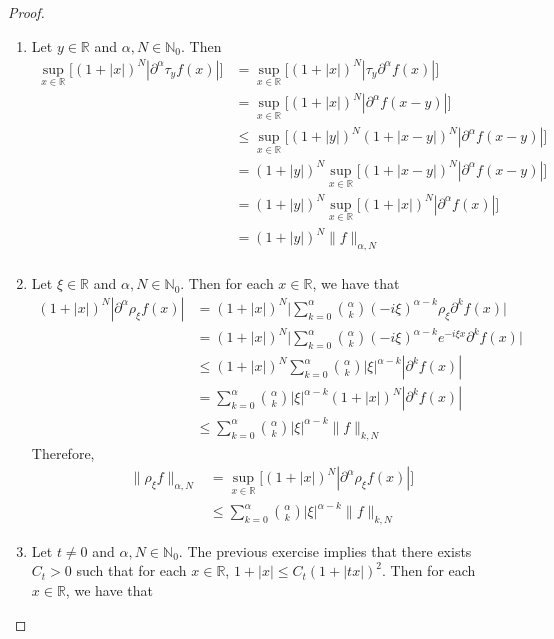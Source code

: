 \documentclass[12pt]{amsart}
\theoremstyle{definition}
\newcommand{\p}{\partial}
\newcommand{\al}{\alpha}
\newcommand{\N}{\mathbb{N}}
\newcommand{\R}{\mathbb{R}}
\begin{document}
	\begin{proof}\
		\begin{enumerate}
			\item  Let $y \in \R$ and $\al,N \in \N_0$. Then 
			\begin{align*}
				\sup_{x \in \R} \bigg[ (1+|x|)^N |\p^{\al} \tau_yf(x)|\bigg] 
				& =  \sup_{x \in \R} \bigg[ (1+|x|)^N | \tau_y\p^{\al} f(x)|\bigg] \\ 
				& =  \sup_{x \in \R} \bigg[ (1+|x|)^N |\p^{\al} f(x - y)|\bigg] \\ 
				& \leq \sup_{x \in \R} \bigg[ (1+|y|)^N(1 + |x -y|)^N |\p^{\al} f(x - y)|\bigg] \\ 
				& = (1+|y|)^N\sup_{x \in \R} \bigg[ (1 + |x -y|)^N |\p^{\al} f(x - y)|\bigg] \\ 
				& = (1+|y|)^N\sup_{x \in \R} \bigg[ (1 + |x|)^N |\p^{\al} f(x)|\bigg] \\ 
				& = (1+|y|)^N \|f\|_{\al, N} \\ 
			\end{align*}
			\item Let $\xi \in \R$ and $\al, N \in \N_0$. Then for each $x \in \R$, we have that
			\begin{align*}
				(1 + |x|)^N |\p^{\al} \rho_{\xi} f(x)| 
				& = (1 + |x|)^N\bigg| \sum\limits_{k=0}^{\al} {\al \choose k} (-i\xi)^{\al-k}\rho_{\xi} \p^{k}f(x) \bigg| \\
				& = (1 + |x|)^N\bigg| \sum\limits_{k=0}^{\al} {\al \choose k} (-i\xi)^{\al-k} e^{-i\xi x}\p^{k}f(x) \bigg| \\
				& \leq (1 + |x|)^N \sum\limits_{k=0}^{\al} {\al \choose k} |\xi|^{\al-k} |\p^{k}f(x)| \\
				& = \sum\limits_{k=0}^{\al} {\al \choose k} |\xi|^{\al-k} (1 + |x|)^N|\p^{k}f(x)| \\
				& \leq \sum\limits_{k=0}^{\al} {\al \choose k} |\xi|^{\al-k} \|f\|_{k, N}
			\end{align*}
			Therefore,
			\begin{align*}
				\|\rho_{\xi}f\|_{\al,N} 
				& = \sup_{x \in \R} \bigg[ (1 + |x|)^N |\p^{\al} \rho_{\xi} f(x)|  \bigg] \\
				& \leq \sum\limits_{k=0}^{\al} {\al \choose k} |\xi|^{\al-k} \|f\|_{k, N}
			\end{align*}
			\item Let $t \neq 0$ and $\al, N \in \N_0$. The previous exercise implies that there exists $C_t > 0$ such that for each $x \in \R$, $1 + |x| \leq C_t(1 + |tx|)^2$. Then for each $x \in \R$, we have that 

\end{enumerate}
\end{proof}
\end{document}
